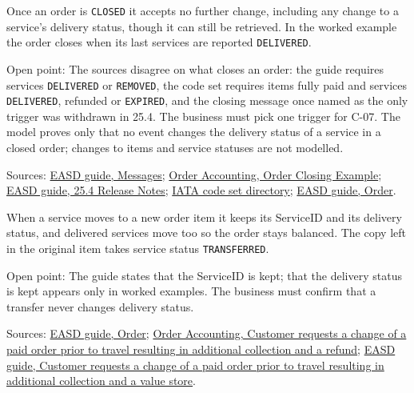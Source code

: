 \begin{theorem}
  \label{thm:delivery-closed-frozen}
  \notready
  Once an order is \texttt{CLOSED} it accepts no further change, including
  any change to a service's delivery status, though it can still be
  retrieved. In the worked example the order closes when its last services
  are reported \texttt{DELIVERED}.

  Open point: The sources disagree on what closes an order: the guide
  requires services \texttt{DELIVERED} or \texttt{REMOVED}, the code set
  requires items fully paid and services \texttt{DELIVERED}, refunded or
  \texttt{EXPIRED}, and the closing message once named as the only trigger
  was withdrawn in 25.4. The business must pick one trigger for C-07.  The
  model proves only that no event changes the delivery status of a service
  in a closed order; changes to items and service statuses are not
  modelled.

  Sources: \href{https://standards.atlassian.net/wiki/spaces/EASD/pages/574652427/Messages}{EASD guide, Messages};
  \href{https://standards.atlassian.net/wiki/spaces/OA/pages/2531491864}{Order Accounting, Order Closing Example};
  \href{https://standards.atlassian.net/wiki/spaces/EASD/pages/2533031940}{EASD guide, 25.4 Release Notes};
  \href{https://standards.atlassian.net/wiki/spaces/AIDM/pages/607420437/View+IATA+Codeset+Directory}{IATA code set directory};
  \href{https://standards.atlassian.net/wiki/spaces/EASD/pages/574849062/Order}{EASD guide, Order}.
\end{theorem}

\begin{theorem}
  \label{thm:delivery-transfer-keeps-status}
  \notready
  When a service moves to a new order item it keeps its ServiceID and its
  delivery status, and delivered services move too so the order stays
  balanced. The copy left in the original item takes service status
  \texttt{TRANSFERRED}.

  Open point: The guide states that the ServiceID is kept; that the delivery
  status is kept appears only in worked examples. The business must confirm
  that a transfer never changes delivery status.

  Sources: \href{https://standards.atlassian.net/wiki/spaces/EASD/pages/574849062/Order}{EASD guide, Order};
  \href{https://standards.atlassian.net/wiki/spaces/OA/pages/844202130}{Order Accounting, Customer requests a change of a paid order prior to travel resulting in additional collection and a refund};
  \href{https://standards.atlassian.net/wiki/spaces/EASD/pages/842268712}{EASD guide, Customer requests a change of a paid order prior to travel resulting in additional collection and a value store}.
\end{theorem}

